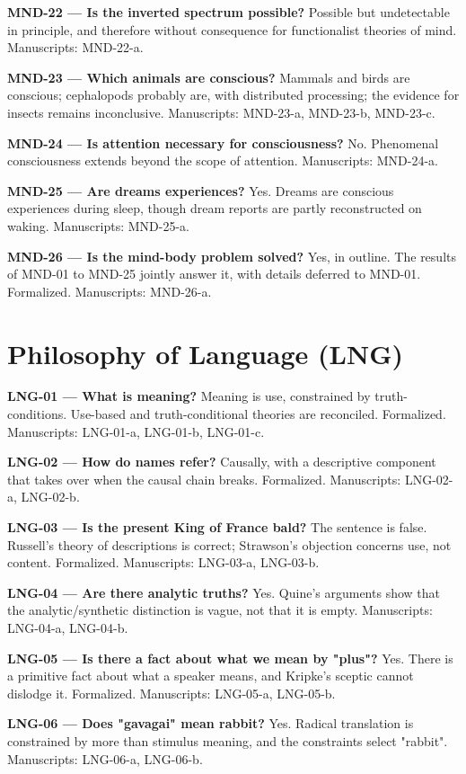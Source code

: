 \documentclass[10pt]{article}
\begin{document}
\textbf{MND-22 --- Is the inverted spectrum possible?} Possible but undetectable in principle, and therefore without consequence for functionalist theories of mind. Manuscripts: MND-22-a.

\textbf{MND-23 --- Which animals are conscious?} Mammals and birds are conscious; cephalopods probably are, with distributed processing; the evidence for insects remains inconclusive. Manuscripts: MND-23-a, MND-23-b, MND-23-c.

\textbf{MND-24 --- Is attention necessary for consciousness?} No. Phenomenal consciousness extends beyond the scope of attention. Manuscripts: MND-24-a.

\textbf{MND-25 --- Are dreams experiences?} Yes. Dreams are conscious experiences during sleep, though dream reports are partly reconstructed on waking. Manuscripts: MND-25-a.

\textbf{MND-26 --- Is the mind-body problem solved?} Yes, in outline. The results of MND-01 to MND-25 jointly answer it, with details deferred to MND-01. Formalized. Manuscripts: MND-26-a.

\section*{Philosophy of Language (LNG)}
\textbf{LNG-01 --- What is meaning?} Meaning is use, constrained by truth-conditions. Use-based and truth-conditional theories are reconciled. Formalized. Manuscripts: LNG-01-a, LNG-01-b, LNG-01-c.

\textbf{LNG-02 --- How do names refer?} Causally, with a descriptive component that takes over when the causal chain breaks. Formalized. Manuscripts: LNG-02-a, LNG-02-b.

\textbf{LNG-03 --- Is the present King of France bald?} The sentence is false. Russell's theory of descriptions is correct; Strawson's objection concerns use, not content. Formalized. Manuscripts: LNG-03-a, LNG-03-b.

\textbf{LNG-04 --- Are there analytic truths?} Yes. Quine's arguments show that the analytic/synthetic distinction is vague, not that it is empty. Manuscripts: LNG-04-a, LNG-04-b.

\textbf{LNG-05 --- Is there a fact about what we mean by "plus"?} Yes. There is a primitive fact about what a speaker means, and Kripke's sceptic cannot dislodge it. Formalized. Manuscripts: LNG-05-a, LNG-05-b.

\textbf{LNG-06 --- Does "gavagai" mean rabbit?} Yes. Radical translation is constrained by more than stimulus meaning, and the constraints select "rabbit". Manuscripts: LNG-06-a, LNG-06-b.
\end{document}
